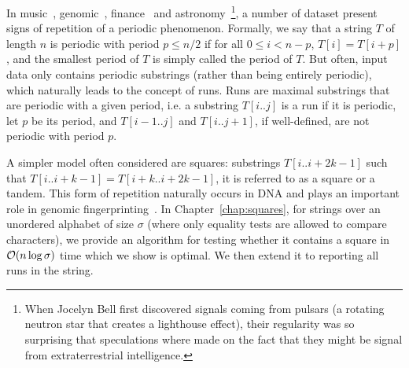 In music~\cite{arom1989time}, genomic~\cite{pich2018somatic}, finance~\cite{harvey2007trends} and astronomy~\cite{hewish1979observation}\footnote{ When Jocelyn Bell first discovered signals coming from pulsars (a rotating neutron star that creates a lighthouse effect), their regularity was so surprising that speculations where made on the fact that they might be signal from extraterrestrial intelligence.}, a number of dataset present signs of repetition of a periodic phenomenon.
Formally, we say that a string $T$ of length $n$ is periodic with period $p \leq n/2$ if for all $0 \leq i < n - p$, $T[i]=T[i+p]$, and the smallest period of $T$ is simply called the period of $T$.
%
But often, input data only contains periodic substrings (rather than being entirely periodic), which naturally leads to the concept of runs. Runs are maximal substrings that are periodic with a given period, i.e. a substring $T[i..j]$ is a run if it is periodic, let $p$ be its period, and $T[i-1..j]$ and $T[i..j+1]$, if well-defined, are not periodic with period $p$. 

A simpler model often considered are squares: substrings $T[i..i+2k-1]$ such that $T[i..i+k-1]=T[i+k..i+2k-1]$, it is referred to as a square or a tandem. This form of repetition naturally occurs in DNA and plays an important role in genomic fingerprinting~\cite{Kolpakov2003,GYMREK20179}. 
%
In Chapter~\ref{chap:squares}, for strings over an unordered alphabet of size $\sigma$ (where only equality tests are allowed to compare characters), we provide an algorithm for testing whether it contains a square in $\mathcal{O}(n\log \sigma)$ time which we show is optimal. We then extend it to reporting all runs in the string.

